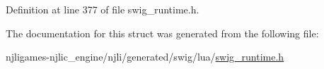 Definition at line 377 of file swig\+\_\+runtime.\+h.



The documentation for this struct was generated from the following file\+:\begin{DoxyCompactItemize}
\item 
njligames-\/njlic\+\_\+engine/njli/generated/swig/lua/\mbox{\hyperlink{swig__runtime_8h}{swig\+\_\+runtime.\+h}}\end{DoxyCompactItemize}
